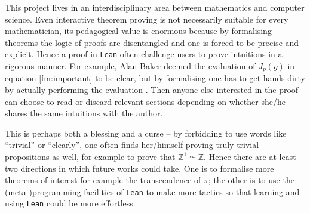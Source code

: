 \documentclass{report}
\theoremstyle{definition}
\begin{document}
This project lives in an interdisciplinary area between mathematics and computer science. Even interactive theorem proving is not necessarily suitable for every mathematician, its pedagogical value is enormous because by formalising theorems the logic of proofs are disentangled and one is forced to be precise and explicit. Hence a proof in {\tt \small Lean} often challenge users to prove intuitions in a rigorous manner. For example, Alan Baker deemed the evaluation of $J_p(g)$ in equation \ref{fm:important} to be clear, but by formalising one has to get hands dirty by actually performing the evaluation \cite{baker1990transcendental}. Then anyone else interested in the proof can choose to read or discard relevant sections depending on whether she/he shares the same intuitions with the author.

This is perhaps both a blessing and a curse -- by forbidding to use words like ``trivial'' or ``clearly'', one often finds her/himself proving truly trivial propositions as well, for example to prove that $\mathbb Z^1\simeq \mathbb Z$. Hence there are at least two directions in which future works could take. One is to formalise more theorems of interest for example the transcendence of $\pi$; the other is to use the (meta-)programming facilities of {\tt\small Lean} to make more tactics so that learning and using {\tt\small Lean} could be more effortless.

%


\nocite{*}
\printbibliography[heading=bibintoc]


\end{document}
